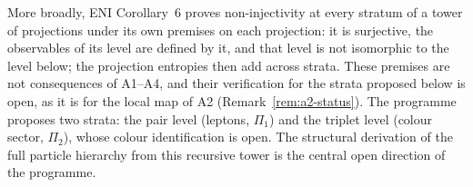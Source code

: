\documentclass[11pt,a4paper]{article}
\begin{document}
      More broadly, ENI Corollary~6 proves non-injectivity at every stratum of a tower of
      projections under its own premises on each projection: it is surjective, the observables of
      its level are defined by it, and that level is not isomorphic to the level below; the
      projection entropies then add across strata.
      These premises are not consequences of A1--A4, and their verification for the strata
      proposed below is open, as it is for the local map of A2 (Remark~\ref{rem:a2-status}).
      The programme proposes two strata: the
      pair level (leptons, $\Pi_1$) and the triplet level (colour sector,
      $\Pi_2$), whose colour identification is open.
      The structural derivation of the full particle hierarchy from this
      recursive tower is the central open direction of the programme.
\end{document}
